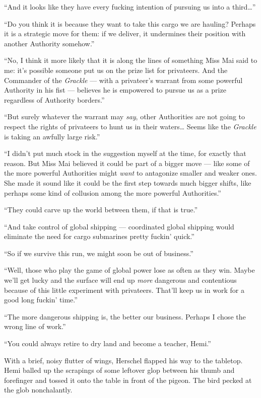 \documentclass[
]{scrbook}
\begin{document}
``And it looks like they have every fucking intention of pursuing us
into a third\ldots{}''

``Do you think it is because they want to take this cargo we are
hauling? Perhaps it is a strategic move for them: if we deliver, it
undermines their position with another Authority somehow.''

``No, I think it more likely that it is along the lines of something
Miss Mai said to me: it's possible someone put us on the prize list for
privateers. And the Commander of the \emph{Grackle} --- with a
privateer's warrant from some powerful Authority in his fist ---
believes he is empowered to pursue us as a prize regardless of Authority
borders.''

``But surely whatever the warrant may \emph{say}, other Authorities are
not going to respect the rights of privateers to hunt us in their
waters\ldots{} Seems like the \emph{Grackle} is taking an awfully large
risk.''

``I didn't put much stock in the suggestion myself at the time, for
exactly that reason. But Miss Mai believed it could be part of a bigger
move --- like some of the more powerful Authorities might \emph{want} to
antagonize smaller and weaker ones. She made it sound like it could be
the first step towards much bigger shifts, like perhaps some kind of
collusion among the more powerful Authorities.''

``They could carve up the world between them, if that is true.''

``And take control of global shipping --- coordinated global shipping
would eliminate the need for cargo submarines pretty fuckin' quick.''

``So if we survive this run, we might soon be out of business.''

``Well, those who play the game of global power lose as often as they
win. Maybe we'll get lucky and the surface will end up \emph{more}
dangerous and contentious because of this little experiment with
privateers. That'll keep us in work for a good long fuckin' time.''

``The more dangerous shipping is, the better our business. Perhaps I
chose the wrong line of work.''

``You could always retire to dry land and become a teacher, Hemi.''

With a brief, noisy flutter of wings, Herschel flapped his way to the
tabletop. Hemi balled up the scrapings of some leftover glop between his
thumb and forefinger and tossed it onto the table in front of the
pigeon. The bird pecked at the glob nonchalantly.
\end{document}
